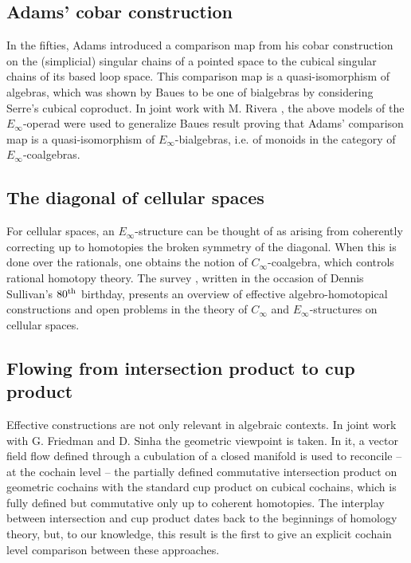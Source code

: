 \subsection{Adams' cobar construction} \label{ss:e-infty operads}

In the fifties, Adams introduced a comparison map from his cobar construction on the (simplicial) singular chains of a pointed space to the cubical singular chains of its based loop space.
This comparison map is a quasi-isomorphism of algebras, which was shown by Baues to be one of bialgebras by considering Serre's cubical coproduct.
In joint work with  M. Rivera \cite{medina2021cobar}, the above models of the $E_\infty$-operad were used to generalize Baues result proving that Adams' comparison map is a quasi-isomorphism of $E_{\infty}$-bialgebras, i.e. of monoids in the category of $E_{\infty}$-coalgebras.

\subsection{The diagonal of cellular spaces}

For cellular spaces, an $E_\infty$-structure can be thought of as arising from coherently correcting up to homotopies the broken symmetry of the diagonal.
When this is done over the rationals, one obtains the notion of $C_\infty$-coalgebra, which controls rational homotopy theory.
The survey \cite{medina2022dennis}, written in the occasion of Dennis Sullivan's $80^{\mathrm{th}}$ birthday, presents an overview of effective algebro-homotopical constructions and open problems in the theory of $C_\infty$ and $E_\infty$-structures on cellular spaces.

\subsection{Flowing from intersection product to cup product} \label{ss:flowing}

Effective constructions are not only relevant in algebraic contexts.
In joint work with G. Friedman and D. Sinha \cite{medina2021flowing} the geometric viewpoint is taken.
In it, a vector field flow defined through a cubulation of a closed manifold is used to reconcile -- at the cochain level -- the partially defined commutative intersection product on geometric cochains with the standard cup product on cubical cochains, which is fully defined but commutative only up to coherent homotopies.
The interplay between intersection and cup product dates back to the beginnings of homology theory, but, to our knowledge, this result is the first to give an explicit cochain level comparison between these approaches.

